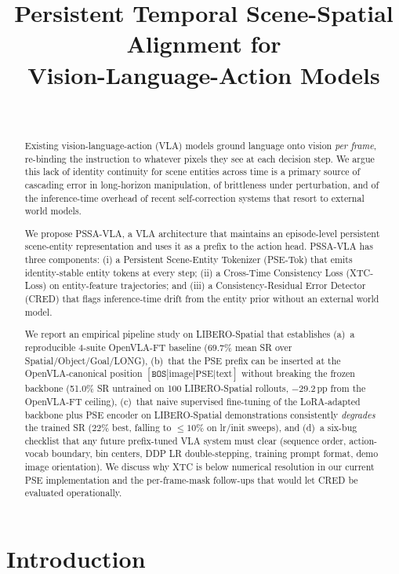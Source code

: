 \documentclass[10pt,letterpaper]{article}
\title{Persistent Temporal Scene-Spatial Alignment for\\
Vision-Language-Action Models}
\author{%
  \todo{author block}\\
  \todo{affiliations}
}
\date{}
\newcommand{\method}{\textsc{PSSA-VLA}\xspace}
\begin{document}
\maketitle

\begin{abstract}
Existing vision-language-action (VLA) models ground language onto vision
\emph{per frame}, re-binding the instruction to whatever pixels they see at
each decision step. We argue this lack of identity continuity for scene
entities across time is a primary source of cascading error in long-horizon
manipulation, of brittleness under perturbation, and of the inference-time
overhead of recent self-correction systems that resort to external world
models.

We propose \method, a VLA architecture that maintains an episode-level
persistent scene-entity representation and uses it as a prefix to the
action head. \method has three components: (i) a Persistent
Scene-Entity Tokenizer (PSE-Tok) that emits identity-stable entity tokens
at every step; (ii) a Cross-Time Consistency Loss (XTC-Loss) on
entity-feature trajectories; and (iii) a Consistency-Residual Error
Detector (CRED) that flags inference-time drift from the entity prior
without an external world model.

We report an empirical pipeline study on LIBERO-Spatial that establishes
(a)~a reproducible 4-suite OpenVLA-FT baseline ($69.7\%$ mean SR over
Spatial/Object/Goal/LONG), (b)~that the PSE prefix can be inserted at the
OpenVLA-canonical position $[\texttt{BOS}|\text{image}|\text{PSE}|\text{text}]$
without breaking the frozen backbone (51.0\% SR untrained on 100
LIBERO-Spatial rollouts, $-$29.2\,pp from the OpenVLA-FT ceiling),
(c)~that naive supervised fine-tuning of the LoRA-adapted backbone plus
PSE encoder on LIBERO-Spatial demonstrations consistently \emph{degrades}
the trained SR ($22\%$ best, falling to $\le 10\%$ on lr/init sweeps), and
(d)~a six-bug checklist that any future prefix-tuned VLA system must
clear (sequence order, action-vocab boundary, bin centers, DDP LR
double-stepping, training prompt format, demo image orientation).
We discuss why XTC is below numerical resolution in our current PSE
implementation and the per-frame-mask follow-ups that would let CRED be
evaluated operationally.
\end{abstract}

\section{Introduction}\label{sec:intro}
\end{document}
